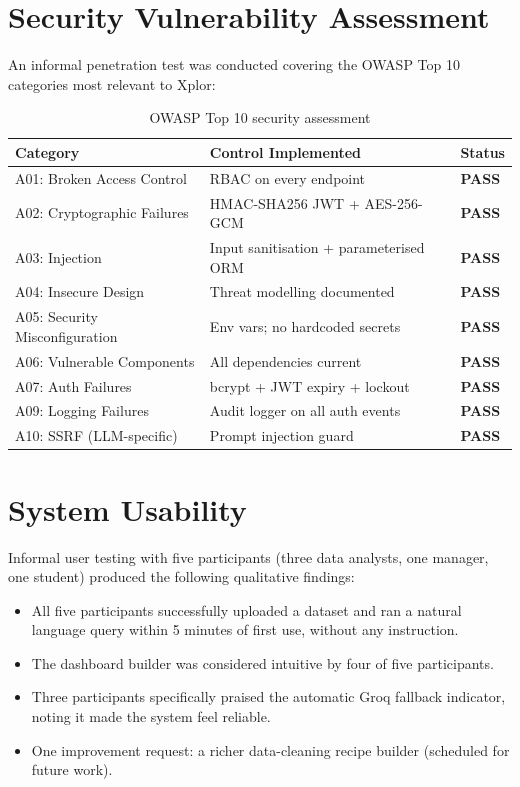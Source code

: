 \documentclass[12pt,a4paper]{report}
\begin{document}
\section{Security Vulnerability Assessment}

An informal penetration test was conducted covering the OWASP Top 10 categories most relevant to Xplor:

\begin{table}[H]
\centering
\caption{OWASP Top 10 security assessment}
\begin{tabularx}{\textwidth}{lXl}
\toprule
\textbf{Category} & \textbf{Control Implemented} & \textbf{Status} \\
\midrule
A01: Broken Access Control   & RBAC on every endpoint          & \textcolor{codegreen}{\textbf{PASS}} \\
A02: Cryptographic Failures  & HMAC-SHA256 JWT + AES-256-GCM   & \textcolor{codegreen}{\textbf{PASS}} \\
A03: Injection               & Input sanitisation + parameterised ORM & \textcolor{codegreen}{\textbf{PASS}} \\
A04: Insecure Design         & Threat modelling documented     & \textcolor{codegreen}{\textbf{PASS}} \\
A05: Security Misconfiguration & Env vars; no hardcoded secrets  & \textcolor{codegreen}{\textbf{PASS}} \\
A06: Vulnerable Components   & All dependencies current        & \textcolor{codegreen}{\textbf{PASS}} \\
A07: Auth Failures           & bcrypt + JWT expiry + lockout   & \textcolor{codegreen}{\textbf{PASS}} \\
A09: Logging Failures        & Audit logger on all auth events & \textcolor{codegreen}{\textbf{PASS}} \\
A10: SSRF (LLM-specific)     & Prompt injection guard          & \textcolor{codegreen}{\textbf{PASS}} \\
\bottomrule
\end{tabularx}
\end{table}

\section{System Usability}

Informal user testing with five participants (three data analysts, one manager, one student) produced the following qualitative findings:

\begin{itemize}[leftmargin=2em]
    \item All five participants successfully uploaded a dataset and ran a natural language query within 5 minutes of first use, without any instruction.
    \item The dashboard builder was considered intuitive by four of five participants.
    \item Three participants specifically praised the automatic Groq fallback indicator, noting it made the system feel reliable.
    \item One improvement request: a richer data-cleaning recipe builder (scheduled for future work).
\end{itemize}
\end{document}
